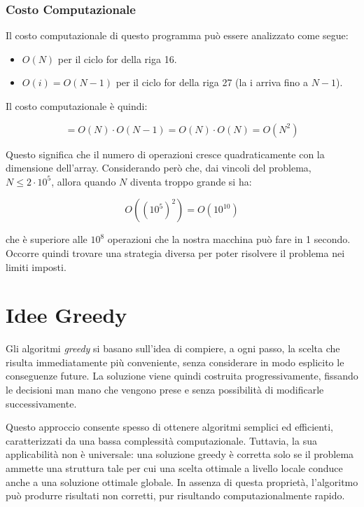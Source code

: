 	\subsubsection*{Costo Computazionale}
	
	Il costo computazionale di questo programma può essere analizzato come segue:
	
	\begin{itemize}
		\item $O(N)$ per il ciclo for della riga 16.
		\item $O(i) = O(N-1)$ per il ciclo for della riga 27 (la i arriva fino a $N-1$). 
	\end{itemize}
	
	\noindent
	Il costo computazionale è quindi:
	
	\[
	 =O(N) \cdot O(N-1)= O(N) \cdot O(N) = O(N^2)
	\]
	
	\noindent
	Questo significa che il numero di operazioni cresce quadraticamente con la dimensione dell'array. 
	Considerando però che, dai vincoli del problema, $N \le 2 \cdot 10^5$, allora quando $N$ diventa troppo grande si ha:
	
	\[
		O((10^5)^2) = O(10^{10})
	\]
	
	che è superiore alle $10^8$ operazioni che la nostra macchina può fare in 1 secondo.
	Occorre quindi trovare una strategia diversa per poter risolvere il problema nei limiti imposti.
	
	
	
	
	
	
	
	\newpage
\section{Idee Greedy}

Gli algoritmi \emph{greedy} si basano sull’idea di compiere, a ogni passo, la scelta che risulta immediatamente più conveniente, senza considerare in modo esplicito le conseguenze future.
La soluzione viene quindi costruita progressivamente, fissando le decisioni man mano che vengono prese e senza possibilità di modificarle successivamente.

Questo approccio consente spesso di ottenere algoritmi semplici ed efficienti, caratterizzati da una bassa complessità computazionale.
Tuttavia, la sua applicabilità non è universale: una soluzione greedy è corretta solo se il problema ammette una struttura tale per cui una scelta ottimale a livello locale conduce anche a una soluzione ottimale globale.
In assenza di questa proprietà, l’algoritmo può produrre risultati non corretti, pur risultando computazionalmente rapido.

